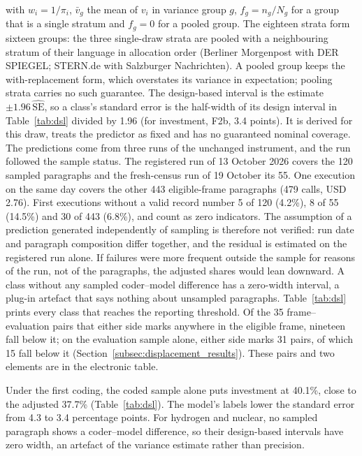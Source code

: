 with $w_i = 1/\pi_i$, $\bar{v}_g$ the mean of $v_i$ in variance group $g$, $f_g = n_g/N_g$ for a group that is a single stratum and $f_g = 0$ for a pooled group. The eighteen strata form sixteen groups: the three single-draw strata are pooled with a neighbouring stratum of their language in allocation order (Berliner Morgenpost with DER SPIEGEL; STERN.de with Salzburger Nachrichten). A pooled group keeps the with-replacement form, which overstates its variance in expectation; pooling strata carries no such guarantee. The design-based interval is the estimate $\pm 1.96\,\widehat{\mathrm{SE}}$, so a class's standard error is the half-width of its design interval in Table~\ref{tab:dsl} divided by 1.96 (for investment, F2b, 3.4 points). It is derived for this draw, treats the predictor as fixed and has no guaranteed nominal coverage. The predictions come from three runs of the unchanged instrument, and the run followed the sample status. The registered run of 13 October 2026 covers the 120 sampled paragraphs and the fresh-census run of 19 October its 55. One execution on the same day covers the other 443 eligible-frame paragraphs (479 calls, USD 2.76). First executions without a valid record number 5 of 120 (4.2\%), 8 of 55 (14.5\%) and 30 of 443 (6.8\%), and count as zero indicators. The assumption of a prediction generated independently of sampling is therefore not verified: run date and paragraph composition differ together, and the residual is estimated on the registered run alone. If failures were more frequent outside the sample for reasons of the run, not of the paragraphs, the adjusted shares would lean downward. A class without any sampled coder--model difference has a zero-width interval, a plug-in artefact that says nothing about unsampled paragraphs. Table~\ref{tab:dsl} prints every class that reaches the reporting threshold. Of the 35 frame--evaluation pairs that either side marks anywhere in the eligible frame, nineteen fall below it; on the evaluation sample alone, either side marks 31 pairs, of which 15 fall below it (Section~\ref{subsec:displacement_results}). These pairs and two elements are in the electronic table.

Under the first coding, the coded sample alone puts investment at 40.1\%, close to the adjusted 37.7\% (Table~\ref{tab:dsl}). The model's labels lower the standard error from 4.3 to 3.4 percentage points. For hydrogen and nuclear, no sampled paragraph shows a coder--model difference, so their design-based intervals have zero width, an artefact of the variance estimate rather than precision.

